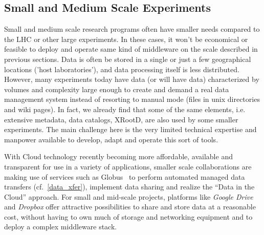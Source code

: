 \subsection{Small and Medium Scale Experiments}
Small and medium scale research programs often have smaller needs compared to the LHC or other large experiments. In these cases, it won't
be economical or feasible to deploy and operate same kind of middleware on the scale described in previous sections.
Data is often be stored in a single or just a few geographical locations ('host laboratories'), and
data processing itself is less distributed. However, many experiments today have data (or will have data) characterized by volumes
and complexity large enough to create and demand a real data management system instead of resorting to manual mode (files in unix directories and wiki pages). 
In fact, we already find that some of the same elements, i.e. extensive metadata, data catalogs, XRootD, are also used by some smaller 
experiments. The main challenge here is the very limited technical expertise and manpower available to develop, adapt and 
operate this sort of tools.

With Cloud technology recently becoming more affordable, available and transparent for use in a variety of applications, smaller
scale collaborations are making use of services such as Globus~\cite{globus} to perform automated managed data transfers (cf.~\ref{data_xfer}),
implement data sharing and realize the ``Data in the Cloud'' approach. For small and mid-scale projects, platforms like \textit{Google Drive}
and \textit{Dropbox} offer attractive possibilities to share and store data at a reasonable cost, without having to own much of storage and
networking equipment and to deploy a complex middleware stack.





